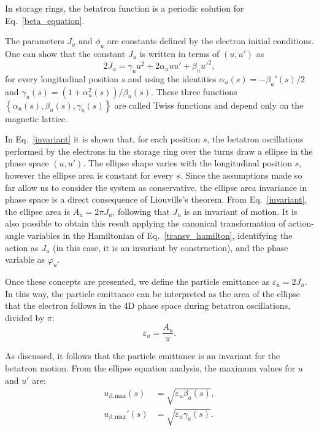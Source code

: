 In storage rings, the betatron function is a periodic solution for Eq.~\eqref{beta_equation}.

The parameters $J_u$ and $\phi_u$ are constants defined by the electron initial conditions. One can show that the constant $J_u$ is written in terms of $(u, u')$ as
\begin{equation}
    2J_u = \gamma_u u^2 + 2 \alpha_u u u' + \beta_u {u'}^2,
    \label{invariant}
\end{equation}
for every longitudinal position $s$ and using the identities $\alpha_u(s) = -\beta_u'(s)/2$ and $\gamma_u(s) = (1 + \alpha_u^2(s))/\beta_u(s)$. These three functions $\left\{\alpha_u(s), \beta_u(s), \gamma_u(s)\right\}$ are called Twiss functions and depend only on the magnetic lattice.

In Eq.~\eqref{invariant} it is shown that, for each position $s$, the betatron oscillations performed by the electrons in the storage ring over the turns draw a ellipse in the phase space $(u, u')$. The ellipse shape varies with the longitudinal position $s$, however the ellipse area is constant for every $s$. Since the assumptions made so far allow us to consider the system as conservative, the ellipse area invariance in phase space is a direct consequence of Liouville's theorem. From Eq.~\eqref{invariant}, the ellipse area is $A_u = 2 \pi J_u$, following that $J_u$ is an invariant of motion. It is also possible to obtain this result applying the canonical transformation of action-angle variables in the Hamiltonian of Eq.~\eqref{transv_hamilton}, identifying the action as $J_u$ (in this case, it is an invariant by construction), and the phase variable as $\varphi_u$.

Once these concepts are presented, we define the particle emittance as $\varepsilon_u = 2J_u$. In this way, the particle emittance can be interpreted as the area of the ellipse that the electron follows in the 4D phase space during betatron oscillations, divided by $\pi$:
\begin{equation}
    \varepsilon_u = \frac{A_u}{\pi}.
\end{equation}

As discussed, it follows that the particle emittance is an invariant for the betatron motion. From the ellipse equation analysis, the maximum values for $u$ and $u'$ are:
\begin{align}
    u_{\beta, \mathrm{max}}(s) &= \sqrt{\varepsilon_u \beta_u(s)}, \\
    {u}_{\beta, \mathrm{max}}'(s) &= \sqrt{\varepsilon_u \gamma_u(s)}.
\end{align}

